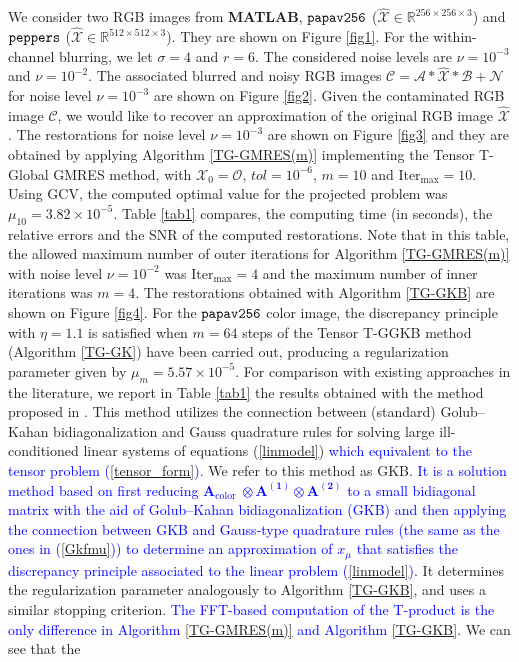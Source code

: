 \documentclass{siamltex}
\newcommand{\1}{\mathbb{1}}
\newcommand{\0}{\mathbb{0}}
\begin{document}
	 We consider two $\mathrm{RGB}$ images from \textbf{MATLAB}, $\tt papav256$ ($\widehat{\mathscr X}\in\mathbb{R}^{256\times256\times3}$) and  $\tt peppers$ ($\widehat{\mathscr X}\in\mathbb{R}^{512\times512\times3}$). They are shown on  Figure \ref{fig1}. For the within-channel blurring,  we let $\sigma=4$ and $r=6$. The considered  noise levels are $\nu=10^{-3}$ and $\nu=10^{-2}$. The associated blurred and noisy RGB images $\mathscr{C}=\mathscr{A}\ast\widehat{\mathscr{X}}\ast\mathscr{B}+\mathscr{N}$ for noise level $\nu=10^{-3}$ are shown on  Figure \ref{fig2}.  Given the contaminated RGB image $\mathscr{C}$, we would like to recover an approximation of the original RGB image $\widehat{\mathscr X}$.   The restorations for  noise level $\nu=10^{-3}$ are shown on  Figure \ref{fig3} and they are obtained by applying Algorithm \ref{TG-GMRES(m)} implementing the  Tensor T-Global GMRES method, with  $\mathscr{X}_0=\mathscr{O}$, $tol=10^{-6}$, $m=10$ and $\text{Iter}_\text{max}=10$. Using GCV, the computed optimal value for the projected problem  was $\mu_{10}=3.82\times 10^{-5}.$ Table \ref{tab1} compares, the computing time (in seconds),  the relative errors and the SNR of the computed restorations. Note that in this table, the allowed maximum number of outer iterations for Algorithm \ref{TG-GMRES(m)}  with noise level $\nu=10^{-2}$ was $\text{Iter}_\text{max}=4$ and the maximum number of inner iterations was $m=4$.  The restorations obtained with Algorithm \ref{TG-GKB}  are shown on  Figure \ref{fig4}. For the $\tt papav256$ color image, the discrepancy principle with $\eta=1.1$ is satisfied when $m=64$ steps of the Tensor T-GGKB  method (Algorithm \ref{TG-GK}) have been carried out, producing a regularization parameter given by $\mu_m=5.57\times 10^{-5}$. For comparison with existing approaches in the literature, we report in Table \ref{tab1} the results obtained with the method 
	proposed in \cite{CR}. This method utilizes the connection between (standard) 
	Golub--Kahan bidiagonalization and Gauss quadrature rules for solving large 
	ill-conditioned linear systems of equations (\ref{linmodel}) \textcolor{blue}{which equivalent to the tensor problem (\ref{tensor_form}).}  We refer to this method as
	GKB.  \textcolor{blue}{It is  a solution method based on
	first reducing $\mathbf{A}_{\text {color }} \otimes \mathbf{A^{(1)}}\otimes\mathbf{A^{(2)}}$ to a small bidiagonal matrix with the aid of Golub–Kahan
	bidiagonalization (GKB) and then applying the connection between GKB
	and Gauss-type quadrature rules (the same as the ones in (\ref{Gkfmu})) to determine an approximation of $x_\mu$ that
	satisfies the discrepancy principle associated to the linear problem  (\ref{linmodel})}. It determines the regularization parameter analogously to Algorithm \ref{TG-GKB}, and uses a similar stopping criterion. \textcolor{blue}{The FFT-based computation of the T-product is  the only difference in Algorithm \ref{TG-GMRES(m)} and Algorithm \ref{TG-GKB}}. We can see that the
\end{document}
